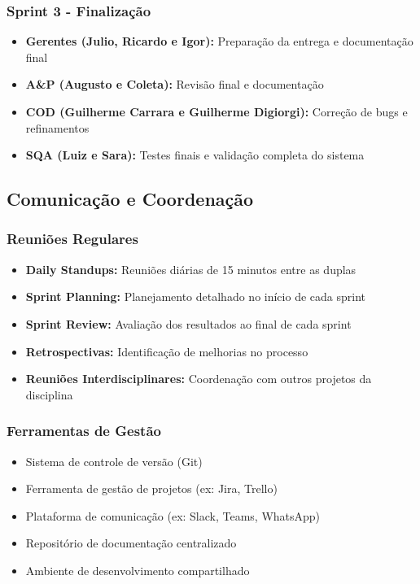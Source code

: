 \subsubsection{Sprint 3 - Finalização}
\begin{itemize}
    \item \textbf{Gerentes (Julio, Ricardo e Igor):} Preparação da entrega e documentação final
    \item \textbf{A\&P (Augusto e Coleta):} Revisão final e documentação
    \item \textbf{COD (Guilherme Carrara e Guilherme Digiorgi):} Correção de bugs e refinamentos
    \item \textbf{SQA (Luiz e Sara):} Testes finais e validação completa do sistema
\end{itemize}

\subsection{Comunicação e Coordenação}

\subsubsection{Reuniões Regulares}
\begin{itemize}
    \item \textbf{Daily Standups:} Reuniões diárias de 15 minutos entre as duplas
    \item \textbf{Sprint Planning:} Planejamento detalhado no início de cada sprint
    \item \textbf{Sprint Review:} Avaliação dos resultados ao final de cada sprint
    \item \textbf{Retrospectivas:} Identificação de melhorias no processo
    \item \textbf{Reuniões Interdisciplinares:} Coordenação com outros projetos da disciplina
\end{itemize}

\subsubsection{Ferramentas de Gestão}
\begin{itemize}
    \item Sistema de controle de versão (Git)
    \item Ferramenta de gestão de projetos (ex: Jira, Trello)
    \item Plataforma de comunicação (ex: Slack, Teams, WhatsApp)
    \item Repositório de documentação centralizado
    \item Ambiente de desenvolvimento compartilhado
\end{itemize}


